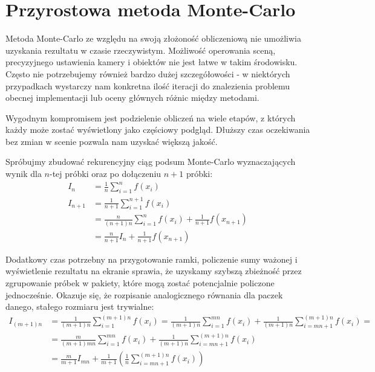 \documentclass[../main.tex]{subfiles}
\begin{document}
\section{Przyrostowa metoda Monte-Carlo}

Metoda Monte-Carlo ze względu na swoją złożoność obliczeniową nie umożliwia uzyskania rezultatu w czasie rzeczywistym. Możliwość operowania sceną, precyzyjnego ustawienia kamery i obiektów nie jest łatwe w takim środowisku. Często nie potrzebujemy również bardzo dużej szczegółowości - w niektórych przypadkach wystarczy nam konkretna ilość iteracji do znalezienia problemu obecnej implementacji lub oceny głównych różnic między metodami.

Wygodnym kompromisem jest podzielenie obliczeń na wiele etapów, z których każdy może zostać wyświetlony jako częściowy podgląd. Dłuższy czas oczekiwania bez zmian w scenie pozwala nam uzyskać większą jakość.

Spróbujmy zbudować rekurencyjny ciąg podsum Monte-Carlo wyznaczających wynik dla $n$-tej próbki oraz po dołączeniu $n+1$ próbki:
\begin{equation}	
\begin{aligned}
I_n &= \frac{1}{n} \sum_{i=1}^{n} f(x_i) \\
I_{n+1} &= \frac{1}{n+1} \sum_{i=1}^{n+1}f(x_i) \\
	&= \frac{n}{(n+1)n} \sum_{i=1}^{n}f(x_i) + \frac{1}{n+1}f(x_{n+1}) \\
	&= \frac{n}{n+1} I_{n} + \frac{1}{n+1}f(x_{n+1})
\end{aligned}
\label{eq:mc_incremental_mc_single}
\end{equation}

Dodatkowy czas potrzebny na przygotowanie ramki, policzenie sumy ważonej i wyświetlenie rezultatu na ekranie sprawia, że uzyskamy szybszą zbieżność przez zgrupowanie próbek w pakiety, które mogą zostać potencjalnie policzone jednocześnie. Okazuje się, że rozpisanie analogicznego równania dla paczek danego, stałego rozmiaru jest trywialne:
\begin{equation}	
\begin{aligned}
  I_{(m+1)n} &= \frac{1}{(m+1)n} \sum_{i=1}^{(m+1)n} f(x_i)
  = \frac{1}{(m+1)n} \sum_{i=1}^{mn} f(x_i)
    + \frac{1}{(m+1)n} \sum_{i=mn+1}^{(m+1)n} f(x_i) = \\
  &= \frac{m}{(m+1)mn} \sum_{i=1}^{mn} f(x_i)
    + \frac{1}{(m+1)n} \sum_{i=mn+1}^{(m+1)n} f(x_i) \\
  &= \frac{m}{m+1}I_{mn}
    + \frac{1}{m+1} \left(
        \frac{1}{n} \sum_{i=mn+1}^{(m+1)n} f(x_i)
    \right)
\end{aligned}
\label{eq:mc_incremental_mc_packets}
\end{equation}
\end{document}
